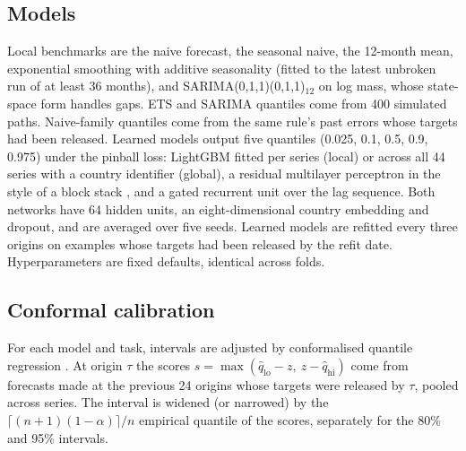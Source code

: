 \documentclass[conference]{IEEEtran}
\begin{document}
\subsection{Models}
Local benchmarks are the naive forecast, the seasonal naive, the 12-month mean, exponential smoothing with additive seasonality (fitted to the latest unbroken run of at least 36 months), and SARIMA(0,1,1)(0,1,1)$_{12}$ on log mass, whose state-space form handles gaps. ETS and SARIMA quantiles come from 400 simulated paths. Naive-family quantiles come from the same rule's past errors whose targets had been released. Learned models output five quantiles (0.025, 0.1, 0.5, 0.9, 0.975) under the pinball loss: LightGBM \cite{ke2017} fitted per series (local) or across all 44 series with a country identifier (global), a residual multilayer perceptron in the style of a block stack \cite{oreshkin2019}, and a gated recurrent unit \cite{cho2014} over the lag sequence. Both networks have 64 hidden units, an eight-dimensional country embedding and dropout, and are averaged over five seeds. Learned models are refitted every three origins on examples whose targets had been released by the refit date. Hyperparameters are fixed defaults, identical across folds.

\subsection{Conformal calibration}
For each model and task, intervals are adjusted by conformalised quantile regression \cite{romano2019}. At origin $\tau$ the scores $s=\max(\hat q_{\mathrm{lo}}-z,\ z-\hat q_{\mathrm{hi}})$ come from forecasts made at the previous 24 origins whose targets were released by $\tau$, pooled across series. The interval is widened (or narrowed) by the $\lceil (n+1)(1-\alpha)\rceil/n$ empirical quantile of the scores, separately for the 80\% and 95\% intervals.
\end{document}
